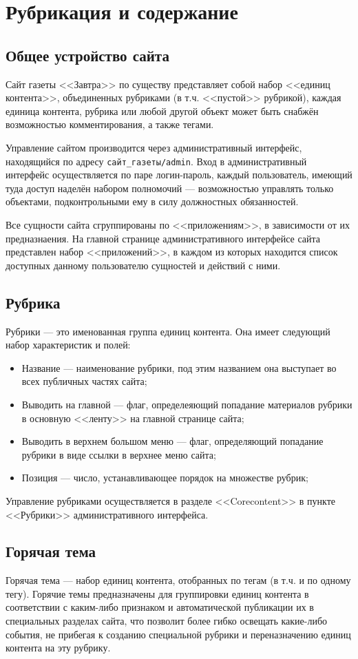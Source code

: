 \chapter{Рубрикация и содержание}
    \section{Общее устройство сайта}
        Сайт газеты <<Завтра>> по существу представляет собой набор <<единиц контента>>, объединенных рубриками (в т.ч. <<пустой>> рубрикой),
        каждая единица контента, рубрика или любой другой объект может быть снабжён возможностью комментирования, а также тегами.
        
        Управление сайтом производится через административный интерфейс, находящийся по адресу \verb+сайт_газеты/admin+. Вход в административный
        интерфейс осуществляется по паре логин-пароль, каждый пользователь, имеющий туда доступ наделён набором полномочий --- возможностью управлять
        только объектами, подконтрольными ему в силу должностных обязанностей.
        
        Все сущности сайта сгруппированы по <<приложениям>>, в зависимости от их предназнаения. На главной странице административного интерфейсе сайта
        представлен набор <<приложений>>, в каждом из которых находится список доступных данному пользователю сущностей и действий с ними.
    \section{Рубрика}
        Рубрики --- это именованная группа единиц контента. Она имеет следующий набор характеристик и полей:
        \begin{itemize}
            \item Название --- наименование рубрики, под этим названием она выступает во всех публичных частях сайта;
            \item Выводить на главной --- флаг, определеяющий попадание материалов рубрики в основную <<ленту>> на главной странице сайта;
            \item Выводить в верхнем большом меню --- флаг, определяющий попадание рубрики в виде ссылки в верхнее меню сайта;
            \item Позиция --- число, устанавливающее порядок на множестве рубрик;
        \end{itemize}
        Управление рубриками осуществляется в разделе <<Corecontent>> в пункте <<Рубрики>> административного интерфейса.
    \section{Горячая тема}
        Горячая тема --- набор единиц контента, отобранных по тегам (в т.ч. и по одному тегу). Горячие темы предназначены для группировки единиц контента
        в соответствии с каким-либо признаком и автоматической публикации их в специальных разделах сайта, что позволит более гибко освещать какие-либо
        события, не прибегая к созданию специальной рубрики и переназначению единиц контента на эту рубрику.


